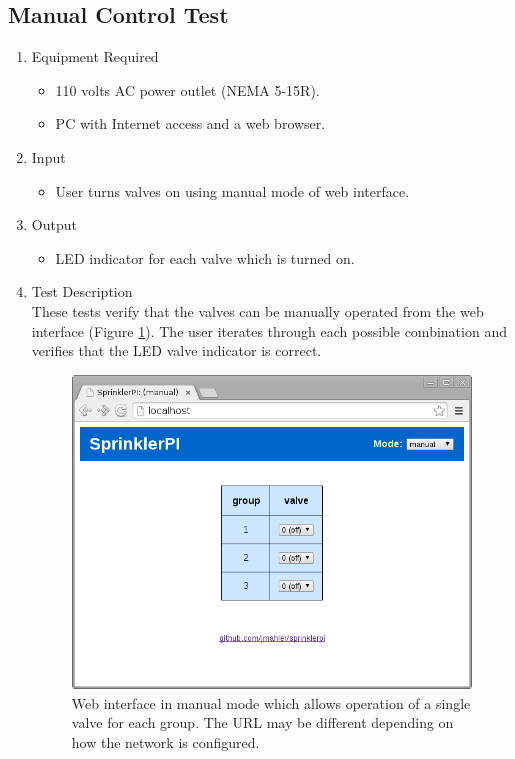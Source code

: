 \documentclass{article}
\begin{document}
\clearpage
\subsection{Manual Control Test}

\begin{enumerate}
\item Equipment Required
	\begin{itemize}
	\item 110 volts AC power outlet (NEMA 5-15R).
	\item PC with Internet access and a web browser.
	\end{itemize}
\item Input
	\begin{itemize}
	\item User turns valves on using manual mode of web interface.
	\end{itemize}
\item Output
	\begin{itemize}
	\item LED indicator for each valve which is turned on.
	\end{itemize}
\item Test Description \\

These tests verify that the valves can be manually operated from
the web interface (Figure \ref{fig:www-manual_mode}).
The user iterates through each possible combination and verifies
that the LED valve indicator is correct.

\begin{figure}[hbp!]
\begin{center}
\includegraphics[scale=0.5]{img/www-manual_mode}
\end{center}
\caption{Web interface in manual mode which allows operation of
a single valve for each group.
The URL may be different depending on how the network is configured.}
\label{fig:www-manual_mode}
\end{figure}


\end{enumerate}
\end{document}
